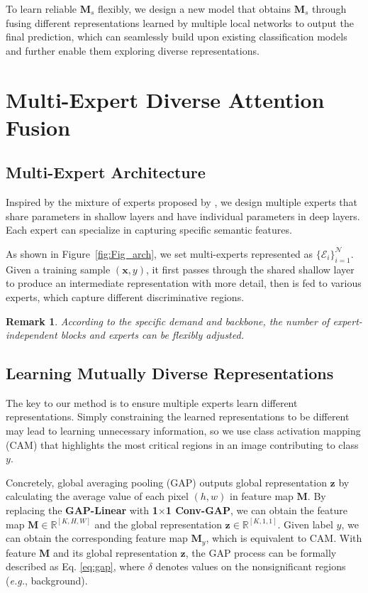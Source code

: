 \documentclass[letterpaper]{article} %
\newtheorem{remark}{Remark}
\newcommand{\eg}{{\emph{e.g.}}}
\begin{document}
To learn reliable $\boldsymbol{M}_s$ flexibly, we design a new model that obtains $\boldsymbol{M}_s$ through fusing different representations learned by multiple local networks to output the final prediction, which can seamlessly build upon existing classification models and further enable them exploring diverse representations.

\section{Multi-Expert Diverse Attention Fusion}
\subsection{Multi-Expert Architecture}
Inspired by the mixture of experts proposed by \cite{shazeer2017moe},
we design multiple experts that share parameters in shallow layers and have individual parameters in deep layers. Each expert can specialize in capturing specific semantic features.

As shown in Figure~\ref{fig:Fig_arch}, we set multi-experts represented as $\{\mathcal{E}_i\}_{i=1}^\mathcal{N}$. Given a training sample $(\boldsymbol{x}, y)$, it first passes through the shared shallow layer to produce an intermediate representation with more detail, then is fed to various experts, which capture different discriminative regions.

\begin{remark}
According to the specific demand and backbone, the number of expert-independent blocks and experts can be flexibly adjusted.
\end{remark}

\subsection{Learning Mutually Diverse Representations}
The key to our method is to ensure multiple experts learn different representations. Simply constraining the learned representations to be different may lead to learning unnecessary information, so we use class activation mapping (CAM) \cite{zhou2016learning} that highlights the most critical regions in an image contributing to class $y$.

Concretely, global averaging pooling (GAP) outputs global representation $\boldsymbol{z}$ by calculating the average value of each pixel $(h,w)$ in feature map $\boldsymbol{M}$. By replacing the \textbf{GAP-Linear} with \textbf{1$\times$1 Conv-GAP}, we can obtain the feature map $\boldsymbol{M}\in\mathbb{R}^{[K,H,W]}$ and the global representation $\boldsymbol{z}\in\mathbb{R}^{[K,1,1]}$. Given label $y$, we can obtain the corresponding feature map $\boldsymbol{M}_y$, which is equivalent to CAM. With feature $\boldsymbol{M}$ and its global representation $\boldsymbol{z}$, the GAP process can be formally described as Eq. \eqref{eq:gap}, where $\delta$ denotes values on the nonsignificant regions (\eg, background).
\end{document}
